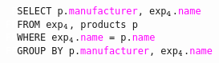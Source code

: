 \newcommand{\sqlcolor}[1]{\textcolor{Bittersweet}{#1}}
\newcommand{\fieldcolor}[1]{\textcolor{Fuchsia}{#1}}
\newcommand{\strcolor}[1]{\textcolor{ForestGreen}{#1}}
\newcommand{\numcolor}[1]{\textcolor{TealBlue}{#1}}

\begin{figure}[h]
    \texttt{
    \textcolor{white}{F}\sqlcolor{SELECT} p.\fieldcolor{manufacturer}, exp$\sb\texttt{4}$.\fieldcolor{name}\\
    \textcolor{white}{FF}\sqlcolor{FROM} exp$\sb\texttt{4}$, products p\\
    \textcolor{white}{FF}\sqlcolor{WHERE} exp$\sb\texttt{4}$.\fieldcolor{name} = p.\fieldcolor{name} \\ 
    \textcolor{white}{FF}\sqlcolor{GROUP BY} p.\fieldcolor{manufacturer}, exp$\sb\texttt{4}$.\fieldcolor{name}
    }
\end{figure}